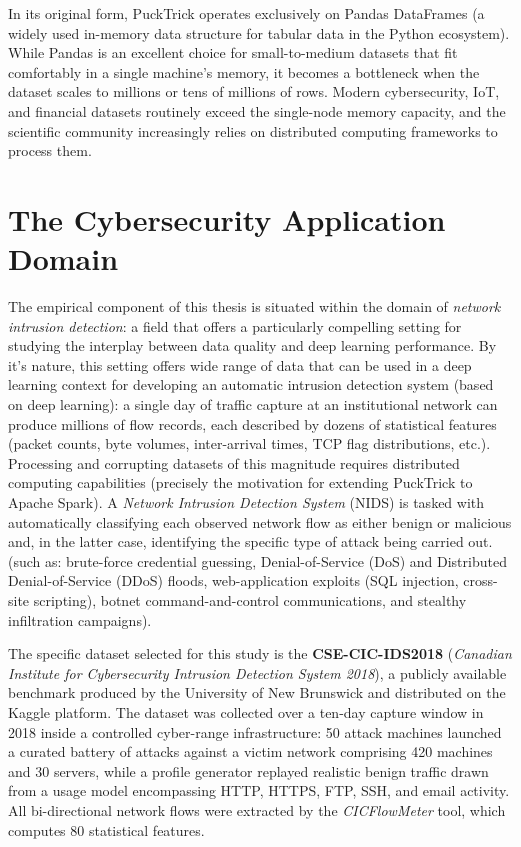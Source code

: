 \documentclass[../main.tex]{subfiles}
\begin{document}
In its original form, PuckTrick operates exclusively on Pandas DataFrames (a widely used in-memory data structure for tabular data in the Python ecosystem).  While Pandas is an excellent choice for small-to-medium datasets that fit comfortably in a single machine's memory, it becomes a bottleneck when the dataset scales to millions or tens of millions of rows.  Modern cybersecurity, IoT, and financial datasets routinely exceed the single-node memory capacity, and the scientific community increasingly relies on distributed computing frameworks to process them.

\newpage
\section{The Cybersecurity Application Domain}
\label{sec:cybersecurity-domain}

The empirical component of this thesis is situated within the domain of \emph{network intrusion detection}: a field that offers a particularly compelling setting for studying the interplay between data quality and deep learning performance.
By it's nature, this setting offers wide range of data that can be used in a deep learning context for developing an automatic intrusion detection system (based on deep learning): a single day of traffic capture at an institutional network can produce millions of flow records, each described by dozens of statistical features (packet counts, byte volumes, inter-arrival times, TCP flag distributions, etc.). Processing and corrupting datasets of this magnitude requires distributed computing capabilities (precisely the motivation for extending PuckTrick to Apache Spark).
A \emph{Network Intrusion Detection System} (NIDS) is tasked with automatically classifying each observed network flow as either benign or malicious and, in the latter case, identifying the specific type of attack being carried out.(such as: brute-force credential guessing, Denial-of-Service (DoS) and Distributed Denial-of-Service (DDoS) floods, web-application exploits (SQL injection, cross-site scripting), botnet command-and-control communications, and stealthy infiltration campaigns).

The specific dataset selected for this study is the \textbf{CSE-CIC-IDS2018}\supercite{ids2018} (\emph{Canadian Institute for Cybersecurity Intrusion Detection System 2018}), a publicly available benchmark produced by the University of New Brunswick and distributed on the Kaggle platform.
The dataset was collected over a ten-day capture window in 2018 inside a controlled cyber-range infrastructure: 50 attack machines launched a curated battery of attacks against a victim network comprising 420 machines and 30 servers, while a profile generator replayed realistic benign traffic drawn from a usage model encompassing HTTP, HTTPS, FTP, SSH, and email activity.
All bi-directional network flows were extracted by the \textit{CICFlowMeter} tool, which computes 80 statistical features.
\end{document}
